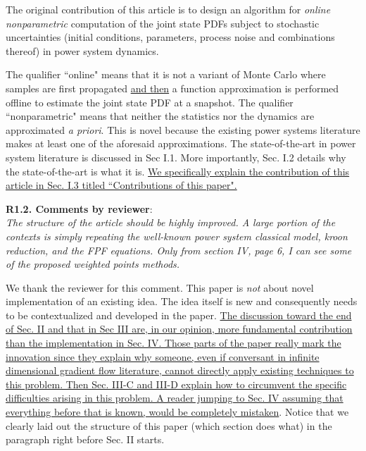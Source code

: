 \documentclass[12pt,onecolumn]{IEEEtran}
\newcommand{\blue}{\color{blue}}
\newcommand{\nib}{\noindent  {\bf Response:} }
\begin{document}
{\nib {\blue The original contribution of this article is to design an algorithm for \emph{online nonparametric} computation of the joint state PDFs subject to stochastic uncertainties (initial conditions, parameters, process noise and combinations thereof) in power system dynamics. 

The qualifier ``online" means that it is not a variant of Monte Carlo where samples are first propagated \ul{and then} a function approximation is performed offline to estimate the joint state PDF at a snapshot. The qualifier ``nonparametric" means that neither the statistics nor the dynamics are approximated \emph{a priori}. This is novel because the existing power systems literature makes at least one of the aforesaid approximations. The state-of-the-art in power system literature is discussed in Sec I.1. More importantly, Sec. I.2 details why the state-of-the-art is what it is. \ul{We specifically explain the contribution of this article in Sec. I.3 titled ``Contributions of this paper".}
}}



\noindent
{\bf R1.2. Comments by reviewer}:\\
{\em The structure of the article should be highly improved. A large portion of the contexts is simply repeating the well-known power system classical model, kroon reduction, and the FPF equations.  Only from section IV, page 6, I can see some of the proposed weighted points methods.}


{\nib{ \blue We thank the reviewer for this comment. This paper is \emph{not} about novel implementation of an existing idea. The idea itself is new and consequently needs to be contextualized and developed in the paper. \ul{The discussion toward the end of Sec. II and that in Sec III are, in our opinion, more fundamental contribution than the implementation in Sec. IV. Those parts of the paper really mark the innovation since they explain why someone, even if conversant in infinite dimensional gradient flow literature, cannot directly apply existing techniques to this problem. Then Sec. III-C and III-D explain how to circumvent the specific difficulties arising in this problem. A reader jumping to Sec. IV assuming that everything before that is known, would be completely mistaken}. Notice that we clearly laid out the structure of this paper (which section does what) in the paragraph right before Sec. II starts.}}
\end{document}

